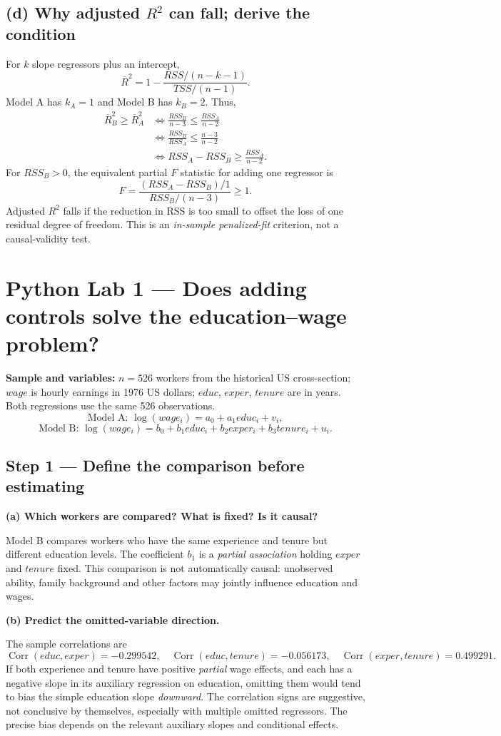 \documentclass[11pt,a4paper]{article}
\begin{document}
\subsection*{(d) Why adjusted $R^2$ can fall; derive the condition}
For $k$ slope regressors plus an intercept,
\[
\overline R^2=1-\frac{RSS/(n-k-1)}{TSS/(n-1)}.
\]
Model A has $k_A=1$ and Model B has $k_B=2$. Thus,
\begin{align*}
\overline R_B^2\ge\overline R_A^2
&\iff \frac{RSS_B}{n-3}\le\frac{RSS_A}{n-2}\\
&\iff \boxed{\frac{RSS_B}{RSS_A}\le\frac{n-3}{n-2}}\\
&\iff \boxed{RSS_A-RSS_B\ge\frac{RSS_A}{n-2}}.
\end{align*}
For $RSS_B>0$, the equivalent partial $F$ statistic for adding one regressor is
\[
F=\frac{(RSS_A-RSS_B)/1}{RSS_B/(n-3)}\ge 1.
\]
Adjusted $R^2$ falls if the reduction in RSS is too small to offset the loss of one residual degree of freedom. This is an \emph{in-sample penalized-fit} criterion, not a causal-validity test.

\section{Python Lab 1 --- Does adding controls solve the education--wage problem?}
\textbf{Sample and variables:} $n=526$ workers from the historical US cross-section; $wage$ is hourly earnings in 1976 US dollars; $educ$, $exper$, $tenure$ are in years. Both regressions use the same 526 observations.
\[
\text{Model A: }\log(wage_i)=a_0+a_1 educ_i+v_i,
\]
\[
\text{Model B: }\log(wage_i)=b_0+b_1 educ_i+b_2 exper_i+b_3 tenure_i+u_i.
\]
\subsection{Step 1 --- Define the comparison before estimating}
\textbf{(a) Which workers are compared? What is fixed? Is it causal?}

Model B compares workers who have the same experience and tenure but different education levels. The coefficient $b_1$ is a \emph{partial association} holding $exper$ and $tenure$ fixed. This comparison is not automatically causal: unobserved ability, family background and other factors may jointly influence education and wages.

\textbf{(b) Predict the omitted-variable direction.}

The sample correlations are
\[
\operatorname{Corr}(educ,exper)=-0.299542,\quad
\operatorname{Corr}(educ,tenure)=-0.056173,\quad
\operatorname{Corr}(exper,tenure)=0.499291.
\]
If both experience and tenure have positive \emph{partial} wage effects, and each has a negative slope in its auxiliary regression on education, omitting them would tend to bias the simple education slope \emph{downward}. The correlation signs are suggestive, not conclusive by themselves, especially with multiple omitted regressors. The precise bias depends on the relevant auxiliary slopes and conditional effects.
\end{document}
